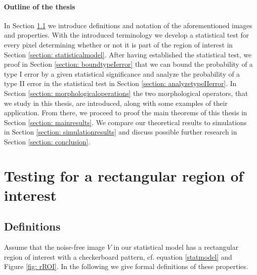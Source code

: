 \documentclass[a4paper,12pt]{article}
\theoremstyle{plain}
\theoremstyle{definition}
\begin{document}
\paragraph{Outline of the thesis}

In Section \ref{section: definitions} we introduce definitions and notation of the aforementioned images and properties. With the introduced terminology we develop a statistical test for every pixel determining whether or not it is part of the region of interest in Section \ref{section: statisticalmodel}. After having established the statistical test, we proof in Section \ref{section: boundtypeIerror} that we can bound the probability of a type I error by a given statistical significance and analyze the probability of a type II error in the statistical test in Section \ref{section: analyzetypeIIerror}. In Section \ref{section: morphologicaloperations} the two morphological operators, that we study in this thesis, are introduced, along with some examples of their application. From there, we proceed to proof the main theorems of this thesis in Section \ref{section: mainresults}. We compare our theoretical results to simulations in Section \ref{section: simulationresults} and discuss possible further research in Section \ref{section: conclusion}.

\newpage



\section{Testing for a rectangular region of interest}

\subsection{Definitions}\label{section: definitions}

Assume that the noise-free image $V$ in our statistical model has a rectangular region of interest with a checkerboard pattern, cf. equation \eqref{statmodel} and Figure \ref{fig: rROI}. In the following we give formal definitions of these properties.
\end{document}
